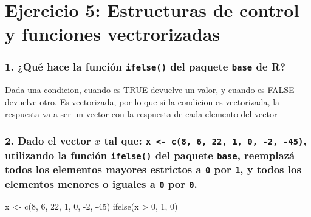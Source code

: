 \documentclass[
]{article}
\newenvironment{Shaded}{\begin{snugshade}}{\end{snugshade}}
\newcommand{\DecValTok}[1]{\textcolor[rgb]{0.00,0.00,0.81}{#1}}
\newcommand{\FunctionTok}[1]{\textcolor[rgb]{0.00,0.00,0.00}{#1}}
\newcommand{\NormalTok}[1]{#1}
\newcommand{\OtherTok}[1]{\textcolor[rgb]{0.56,0.35,0.01}{#1}}
\newcommand{\SpecialCharTok}[1]{\textcolor[rgb]{0.00,0.00,0.00}{#1}}
\begin{document}
\newpage

\hypertarget{ejercicio-5-estructuras-de-control-y-funciones-vectrorizadas}{%
\section{Ejercicio 5: Estructuras de control y funciones
vectrorizadas}\label{ejercicio-5-estructuras-de-control-y-funciones-vectrorizadas}}

\hypertarget{quuxe9-hace-la-funciuxf3n-ifelse-del-paquete-base-de-r}{%
\subsubsection{\texorpdfstring{1. ¿Qué hace la función \texttt{ifelse()}
del paquete \texttt{base} de
R?}{1. ¿Qué hace la función ifelse() del paquete base de R?}}\label{quuxe9-hace-la-funciuxf3n-ifelse-del-paquete-base-de-r}}

Dada una condicion, cuando es TRUE devuelve un valor, y cuando es FALSE
devuelve otro. Es vectorizada, por lo que si la condicion es
vectorizada, la respuesta va a ser un vector con la respuesta de cada
elemento del vector

\hypertarget{dado-el-vector-x-tal-que-x---c8-6-22-1-0--2--45-utilizando-la-funciuxf3n-ifelse-del-paquete-base-reemplazuxe1-todos-los-elementos-mayores-estrictos-a-0-por-1-y-todos-los-elementos-menores-o-iguales-a-0-por-0.}{%
\subsubsection{\texorpdfstring{2. Dado el vector \(x\) tal que:
\texttt{x\ \textless{}-\ c(8,\ 6,\ 22,\ 1,\ 0,\ -2,\ -45)}, utilizando
la función \texttt{ifelse()} del paquete \texttt{base}, reemplazá todos
los elementos mayores estrictos a \texttt{0} por \texttt{1}, y todos los
elementos menores o iguales a \texttt{0} por
\texttt{0}.}{2. Dado el vector x tal que: x \textless- c(8, 6, 22, 1, 0, -2, -45), utilizando la función ifelse() del paquete base, reemplazá todos los elementos mayores estrictos a 0 por 1, y todos los elementos menores o iguales a 0 por 0.}}\label{dado-el-vector-x-tal-que-x---c8-6-22-1-0--2--45-utilizando-la-funciuxf3n-ifelse-del-paquete-base-reemplazuxe1-todos-los-elementos-mayores-estrictos-a-0-por-1-y-todos-los-elementos-menores-o-iguales-a-0-por-0.}}

\begin{Shaded}
\begin{Highlighting}[]
\NormalTok{x }\OtherTok{\textless{}{-}} \FunctionTok{c}\NormalTok{(}\DecValTok{8}\NormalTok{, }\DecValTok{6}\NormalTok{, }\DecValTok{22}\NormalTok{, }\DecValTok{1}\NormalTok{, }\DecValTok{0}\NormalTok{, }\SpecialCharTok{{-}}\DecValTok{2}\NormalTok{, }\SpecialCharTok{{-}}\DecValTok{45}\NormalTok{)}
\FunctionTok{ifelse}\NormalTok{(x }\SpecialCharTok{\textgreater{}} \DecValTok{0}\NormalTok{, }\DecValTok{1}\NormalTok{, }\DecValTok{0}\NormalTok{)}
\end{Highlighting}
\end{Shaded}
\end{document}
